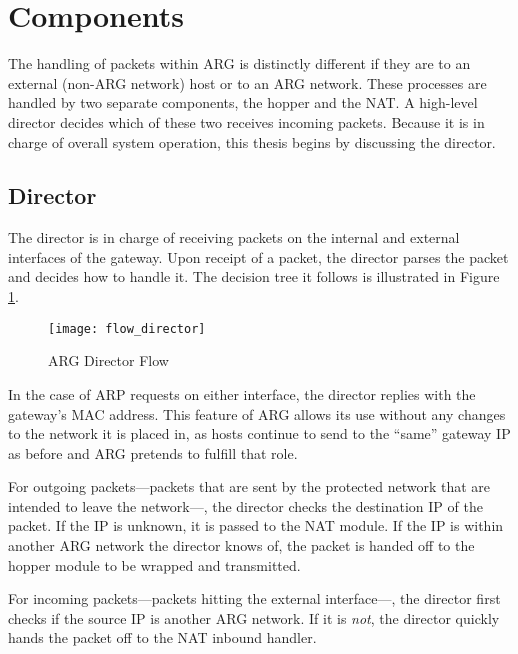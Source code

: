 \section{Components}
\label{sec:arg_components}
The handling of packets within ARG is distinctly different if they are to an external (non-ARG network) host or to an ARG network. These processes are handled by two separate components, the hopper and the NAT. A high-level director decides which of these two receives incoming packets. Because it is in charge of overall system operation, this thesis begins by discussing the director.

\subsection{Director}
\label{sec:arg_director}
\par The director is in charge of receiving packets on the internal and external interfaces of the gateway. Upon receipt of a packet, the director parses the packet and decides how to handle it. The decision tree it follows is illustrated in Figure \ref{fig:arg_director_flow}.

\begin{figure}
\caption{\ac{ARG} Director Flow}
\label{fig:arg_director_flow}
\centering
\texttt{[image: flow\_director]}
\end{figure}

\par In the case of \ac{ARP} requests on either interface, the director replies with the gateway's \ac{MAC} address. This feature of \ac{ARG} allows its use without any changes to the network it is placed in, as hosts continue to send to the ``same'' gateway IP as before and \ac{ARG} pretends to fulfill that role. 

\par For outgoing packets---packets that are sent by the protected network that are intended to leave the network---, the director checks the destination \ac{IP} of the packet. If the IP is unknown, it is passed to the \ac{NAT} module. If the IP is within another \ac{ARG} network the director knows of, the packet is handed off to the hopper module to be wrapped and transmitted.

\par For incoming packets---packets hitting the external interface---, the director first checks if the source IP is another ARG network. If it is \textit{not}, the director quickly hands the packet off to the NAT inbound handler.


